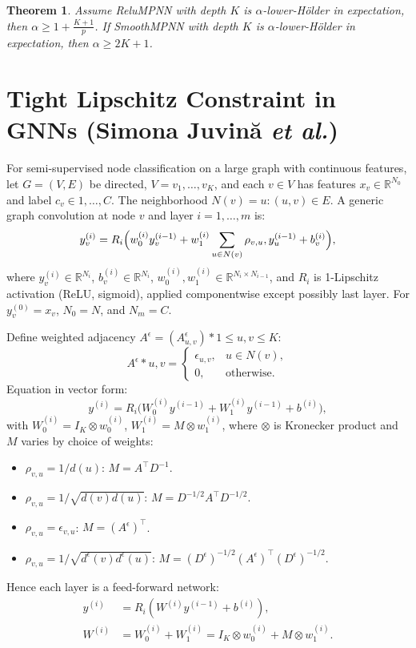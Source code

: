 \documentclass[11pt]{article}\usepackage{amsmath,amssymb,amsthm,bbm}
\newtheorem{theorem}{Theorem}
\newcommand{\1}{\mathbbm{1}}
\begin{document}
\begin{theorem}
Assume ReluMPNN with depth $K$ is $\alpha$-lower-Hölder in expectation, then $\alpha \ge 1 + \tfrac{K+1}{p}$. If SmoothMPNN with depth $K$ is $\alpha$-lower-Hölder in expectation, then $\alpha\ge2K+1$.
\end{theorem}

\section*{Tight Lipschitz Constraint in GNNs (Simona Juvină \emph{et al.})}
For semi-supervised node classification on a large graph with continuous features, let $G=(V,E)$ be directed, $V={v_1,\ldots,v_K}$, and each $v\in V$ has features $x_v\in\mathbb{R}^{N_0}$ and label $c_v\in{1,\ldots,C}$. The neighborhood $N(v)={u:(u,v)\in E}$. A generic graph convolution at node $v$ and layer $i=1,\ldots,m$ is:
\begin{equation}
y_v^{(i)} = R_i\Bigl(w_0^{(i)}y_v^{(i-1)} + w_1^{(i)}\sum_{u\in N(v)}\rho_{v,u},y_u^{(i-1)} + b_v^{(i)}\Bigr),
\end{equation}
where $y_v^{(i)}\in\mathbb{R}^{N_i}$, $b_v^{(i)}\in\mathbb{R}^{N_i}$, $w_0^{(i)},w_1^{(i)}\in\mathbb{R}^{N_i\times N_{i-1}}$, and $R_i$ is 1-Lipschitz activation (ReLU, sigmoid), applied componentwise except possibly last layer. For $y_v^{(0)}=x_v$, $N_0=N$, and $N_m=C$.

Define weighted adjacency $A^\epsilon=(A^\epsilon_{u,v})*{1\le u,v\le K}$:
\begin{equation}
A^\epsilon*{u,v} = \begin{cases} \epsilon_{u,v}, & u\in N(v),\\ 0, & \text{otherwise}. \end{cases}
\end{equation}
Equation in vector form:
\begin{equation}
y^{(i)} = R_i\bigl(W_0^{(i)}y^{(i-1)} + W_1^{(i)}y^{(i-1)} + b^{(i)}\bigr),
\end{equation}
with $W_0^{(i)}=I_K\otimes w_0^{(i)}$, $W_1^{(i)}=M\otimes w_1^{(i)}$, where $\otimes$ is Kronecker product and $M$ varies by choice of weights:
\begin{itemize}
\item $\rho_{v,u}=1/d(u)$: $M=A^\top D^{-1}$.
\item $\rho_{v,u}=1/\sqrt{d(v)d(u)}$: $M=D^{-1/2}A^\top D^{-1/2}$.
\item $\rho_{v,u}=\epsilon_{v,u}$: $M=(A^\epsilon)^\top$.
\item $\rho_{v,u}=1/\sqrt{d^\epsilon(v)d^\epsilon(u)}$: $M=(D^\epsilon)^{-1/2}(A^\epsilon)^\top(D^\epsilon)^{-1/2}$.
\end{itemize}
Hence each layer is a feed-forward network:
\begin{align}
y^{(i)} &= R_i(W^{(i)}y^{(i-1)} + b^{(i)}), \\
W^{(i)} &= W_0^{(i)} + W_1^{(i)} = I_K\otimes w_0^{(i)} + M\otimes w_1^{(i)}.
\end{align}
\end{document}
